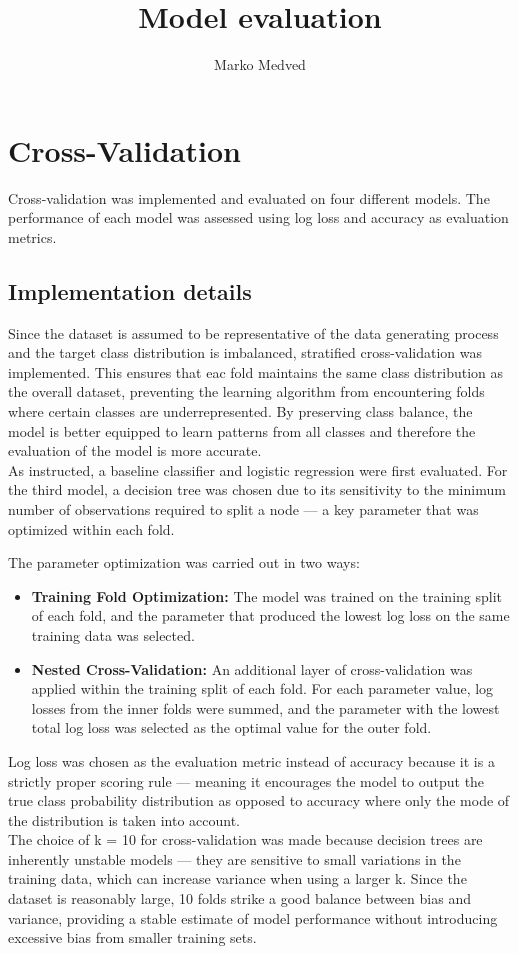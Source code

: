 \documentclass[9pt]{IEEEtran}
\title{\vspace{0ex}
Model evaluation}
\author{Marko Medved\vspace{-4.0ex}}
\begin{document}
\maketitle

\section{Cross-Validation}
Cross-validation was implemented and evaluated on four different models. 
The performance of each model was assessed using log loss and accuracy as
 evaluation metrics.
\subsection{Implementation details}
Since the dataset is assumed to be representative of the data generating process 
and the target class distribution
is imbalanced, stratified cross-validation was implemented. This ensures that eac
 fold maintains the same class distribution as the overall dataset, preventing the
  learning algorithm from encountering folds where certain classes are 
  underrepresented. By preserving class balance, the model is better equipped to 
  learn patterns from all classes and therefore the evaluation of the model is more accurate.
\\
As instructed, a baseline classifier and logistic regression were first
 evaluated. For the third model, a decision tree was chosen due to its 
 sensitivity to the minimum number of observations required to split a node —
  a key parameter that was optimized within each fold.

The parameter optimization was carried out in two ways:

\begin{itemize}
    \item \textbf{Training Fold Optimization:}  
    The model was trained on the training split of each fold, and the parameter that produced the lowest log loss on the same training data was selected.
        
    \item \textbf{Nested Cross-Validation:}  
    An additional layer of cross-validation was applied within the training split of each fold. For each parameter value, log losses from the inner folds were summed, and the parameter with the lowest total log loss was selected as the optimal value for the outer fold.
\end{itemize}

Log loss was chosen as the evaluation metric instead of accuracy because it
 is a strictly proper scoring rule — meaning it encourages the model to output
  the true class probability distribution as opposed to accuracy where only the mode of the distribution 
  is taken into account.
\\
The choice of k = 10 for cross-validation was made because decision trees are 
inherently unstable models — they are sensitive to small variations in the 
training data, which can increase variance when using a larger k. Since the
 dataset is reasonably large, 10 folds strike a good balance between bias and
  variance, providing a stable estimate of model performance without
   introducing excessive bias from smaller training sets.
\end{document}

